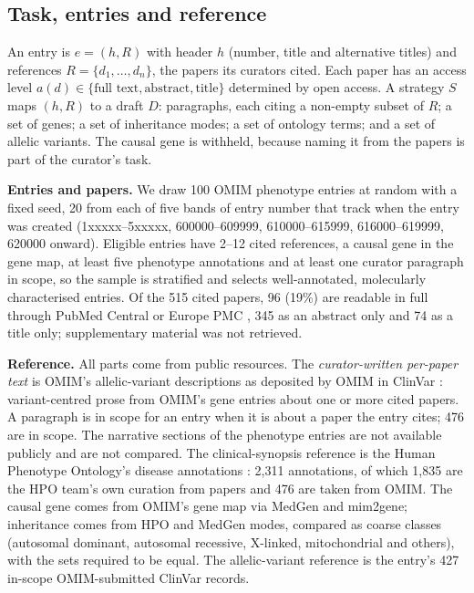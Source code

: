 \documentclass{article} %
\begin{document}
\subsection{Task, entries and reference}
\label{sec:task}
An entry is $e=(h,R)$ with header $h$ (number, title and alternative titles) and references $R=\{d_1,\dots,d_n\}$, the papers its curators cited. Each paper has an access level $a(d)\in\{\text{full text},\text{abstract},\text{title}\}$ determined by open access. A strategy $S$ maps $(h,R)$ to a draft $D$: paragraphs, each citing a non-empty subset of $R$; a set of genes; a set of inheritance modes; a set of ontology terms; and a set of allelic variants. The causal gene is withheld, because naming it from the papers is part of the curator's task.

\textbf{Entries and papers.} We draw 100 OMIM phenotype entries at random with a fixed seed, 20 from each of five bands of entry number that track when the entry was created (1xxxxx--5xxxxx, 600000--609999, 610000--615999, 616000--619999, 620000 onward). Eligible entries have 2--12 cited references, a causal gene in the gene map, at least five phenotype annotations and at least one curator paragraph in scope, so the sample is stratified and selects well-annotated, molecularly characterised entries. Of the 515 cited papers, 96 (19\%) are readable in full through PubMed Central or Europe PMC \citep{rosonovski2024europe}, 345 as an abstract only and 74 as a title only; supplementary material was not retrieved.

\textbf{Reference.} All parts come from public resources. The \emph{curator-written per-paper text} is OMIM's allelic-variant descriptions as deposited by OMIM in ClinVar \citep{landrum2025clinvar}: variant-centred prose from OMIM's gene entries about one or more cited papers. A paragraph is in scope for an entry when it is about a paper the entry cites; 476 are in scope. The narrative sections of the phenotype entries are not available publicly and are not compared. The clinical-synopsis reference is the Human Phenotype Ontology's disease annotations \citep{gargano2024human}: 2,311 annotations, of which 1,835 are the HPO team's own curation from papers and 476 are taken from OMIM. The causal gene comes from OMIM's gene map via MedGen \citep{Louden2020MedgenNcbis} and mim2gene; inheritance comes from HPO and MedGen modes, compared as coarse classes (autosomal dominant, autosomal recessive, X-linked, mitochondrial and others), with the sets required to be equal. The allelic-variant reference is the entry's 427 in-scope OMIM-submitted ClinVar records.
\end{document}
